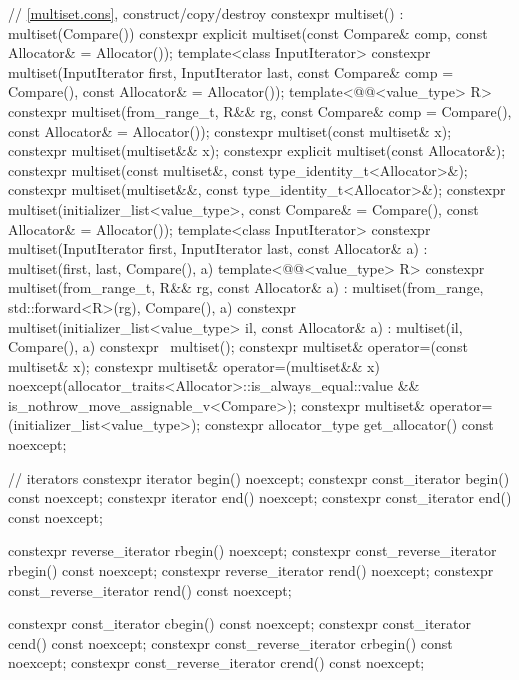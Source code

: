 \begin{codeblock}
{{    // \ref{multiset.cons}, construct/copy/destroy
    constexpr multiset() : multiset(Compare()) { }
    constexpr explicit multiset(const Compare& comp, const Allocator& = Allocator());
    template<class InputIterator>
      constexpr multiset(InputIterator first, InputIterator last,
                         const Compare& comp = Compare(), const Allocator& = Allocator());
    template<@@<value_type> R>
      constexpr multiset(from_range_t, R&& rg,
                         const Compare& comp = Compare(), const Allocator& = Allocator());
    constexpr multiset(const multiset& x);
    constexpr multiset(multiset&& x);
    constexpr explicit multiset(const Allocator&);
    constexpr multiset(const multiset&, const type_identity_t<Allocator>&);
    constexpr multiset(multiset&&, const type_identity_t<Allocator>&);
    constexpr multiset(initializer_list<value_type>, const Compare& = Compare(),
                       const Allocator& = Allocator());
    template<class InputIterator>
      constexpr multiset(InputIterator first, InputIterator last, const Allocator& a)
        : multiset(first, last, Compare(), a) { }
    template<@@<value_type> R>
      constexpr multiset(from_range_t, R&& rg, const Allocator& a)
        : multiset(from_range, std::forward<R>(rg), Compare(), a) { }
    constexpr multiset(initializer_list<value_type> il, const Allocator& a)
      : multiset(il, Compare(), a) { }
    constexpr ~multiset();
    constexpr multiset& operator=(const multiset& x);
    constexpr multiset& operator=(multiset&& x)
      noexcept(allocator_traits<Allocator>::is_always_equal::value &&
               is_nothrow_move_assignable_v<Compare>);
    constexpr multiset& operator=(initializer_list<value_type>);
    constexpr allocator_type get_allocator() const noexcept;

    // iterators
    constexpr iterator               begin() noexcept;
    constexpr const_iterator         begin() const noexcept;
    constexpr iterator               end() noexcept;
    constexpr const_iterator         end() const noexcept;

    constexpr reverse_iterator       rbegin() noexcept;
    constexpr const_reverse_iterator rbegin() const noexcept;
    constexpr reverse_iterator       rend() noexcept;
    constexpr const_reverse_iterator rend() const noexcept;

    constexpr const_iterator         cbegin() const noexcept;
    constexpr const_iterator         cend() const noexcept;
    constexpr const_reverse_iterator crbegin() const noexcept;
    constexpr const_reverse_iterator crend() const noexcept;

}}
\end{codeblock}
